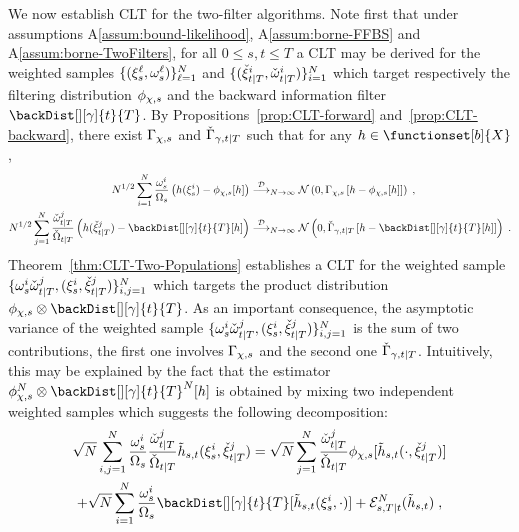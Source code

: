 \label{sec:CLTTwoFilters}
We now establish CLT for the two-filter algorithms. Note first that under assumptions A\ref{assum:bound-likelihood}, A\ref{assum:borne-FFBS} and A\ref{assum:borne-TwoFilters}, for all $0\le s,t\le T$ a CLT may be derived for the weighted samples $\{(\xi_{s}^{\ell},\omega_{s}^{\ell})\}_{\ell=1}^N$ and $\{ ({\check{\xi}}_{t|T}^{i},{\check{\omega}}_{t|T}^{i}) \}_{i=1}^N$ which target respectively the filtering distribution $\filt{\Xinit,s}$ and the backward information filter $\backDist[][\gamma]{t}{T}$. By Propositions~\ref{prop:CLT-forward} and~\ref{prop:CLT-backward}, there exist $\asymVar[\Xinit]{s}{}$ and $\backasymVar[\gamma]{t}{T}{}$ such that for any $h \in \functionset[b]{X}$,
\begin{align}
N^{1/2} \sum_{i=1}^N \frac{\ewght{s}{i}}{\sumwght{s}} \left(h(\epart{s}{i}) - \filt{\Xinit,s}[h]\right) &\dlim_{N \to \infty} \mathcal{N}\left(0,\asymVar[\Xinit]{s}{h - \filt{\Xinit,s}[h]}\right)\eqsp,\label{eq:CLT:forward}\\
N^{1/2} \sum_{j=1}^N \frac{\ebackwght{t}{T}{j}}{\backsumwght{t}{T}} \left(h(\ebackpart{t}{T}{j})- \backDist[][\gamma]{t}{T}[h]\right) &\dlim_{N \to \infty} \mathcal{N}\left(0,\backasymVar[\gamma]{t}{T}{h-\backDist[][\gamma]{t}{T}[h]}\right)\label{eq:CLT:backward}\eqsp.
\end{align}
Theorem~\ref{thm:CLT-Two-Populations} establishes a CLT for the weighted sample $\{ \omega_{s}^{i}{\check{\omega}}_{t|T}^{j}, (\xi_{s}^{i},{\check{\xi}}_{t|T}^{j})\}_{i,j=1}^N$ which targets the product distribution $\filt{\Xinit,s}\otimes \backDist[][\gamma]{t}{T}$. As an important consequence, the asymptotic variance of the weighted sample $\{\omega_{s}^{i}{\check{\omega}}_{t|T}^{j}, (\xi_{s}^{i},{\check{\xi}}_{t|T}^{j})\}_{i,j=1}^N$ is the sum of two contributions, the first one involves $\asymVar[\Xinit]{s}{}$ and the second one $\backasymVar[\gamma]{t}{T}{}$. Intuitively, this may be explained by the fact that the estimator $\filt{\Xinit,s}^N\otimes\backDist[][\gamma]{t}{T}^N[h]$ is obtained by mixing two independent weighted samples which suggests the following decomposition:
\begin{multline*}
\sqrt{N}\sum_{i,j=1}^N \frac{\swght{s}{i}}{\sumwght{s}}\frac{\ebackwght{t}{T}{j}}{\backsumwght{t}{T}} \tilde{h}_{s,t}(\epartpred{s}{i},\ebackpart{t}{T}{j}) = \sqrt{N}\sum_{j=1}^N \frac{\ebackwght{t}{T}{j}}{\backsumwght{t}{T}} \filt{\Xinit,s}[\tilde{h}_{s,t}(\cdot,\ebackpart{t}{T}{j})]\\
+ \sqrt{N}\sum_{i=1}^N \frac{\swght{s}{i}}{\sumwght{s}} \backDist[][\gamma]{t}{T}[\tilde{h}_{s,t}(\epartpred{s}{i},\cdot)] + \mathcal{E}^{N}_{s,T|t}(\tilde{h}_{s,t}) \eqsp,
\end{multline*}
